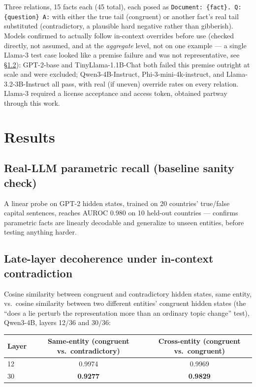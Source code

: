 \documentclass[11pt]{article}
\begin{document}
Three relations, 15 facts each (45 total), each posed as \texttt{Document:
\{fact\}. Q: \{question\} A:} with either the true tail (congruent) or another
fact's real tail substituted (contradictory, a plausible hard negative rather
than gibberish). Models confirmed to actually follow in-context overrides
before use (checked directly, not assumed, and at the \emph{aggregate} level,
not on one example --- a single Llama-3 test case looked like a premise
failure and was not representative, see \S\ref{sec:decoherence}): GPT-2-base
and TinyLlama-1.1B-Chat both failed this premise outright at scale and were
excluded; Qwen3-4B-Instruct, Phi-3-mini-4k-instruct, and Llama-3.2-3B-Instruct
all pass, with real (if uneven) override rates on every relation. Llama-3
required a license acceptance and access token, obtained partway through this
work.

\section{Results}

\subsection{Real-LLM parametric recall (baseline sanity check)}

A linear probe on GPT-2 hidden states, trained on 20 countries' true/false
capital sentences, reaches AUROC 0.980 on 10 held-out countries --- confirms
parametric facts are linearly decodable and generalize to unseen entities,
before testing anything harder.

\subsection{Late-layer decoherence under in-context contradiction}
\label{sec:decoherence}

Cosine similarity between congruent and contradictory hidden states, same
entity, vs.\ cosine similarity between two different entities' congruent
hidden states (the ``does a lie perturb the representation more than an
ordinary topic change'' test), Qwen3-4B, layers 12/36 and 30/36:

\begin{table}[h]
\centering
\begin{tabular}{@{}lcc@{}}
\toprule
Layer & Same-entity (congruent vs.\ contradictory) & Cross-entity (congruent vs.\ congruent) \\
\midrule
12 & 0.9974 & 0.9969 \\
30 & \textbf{0.9277} & \textbf{0.9829} \\
\bottomrule
\end{tabular}
\end{table}
\end{document}
